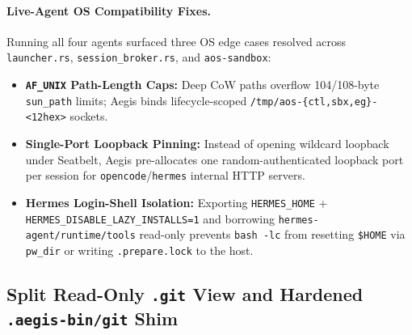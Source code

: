 \documentclass[10pt,twocolumn]{article}
\begin{document}
\paragraph{Live-Agent OS Compatibility Fixes.}
Running all four agents surfaced three OS edge cases resolved across \texttt{launcher.rs}, \texttt{session\_broker.rs}, and \texttt{aos-sandbox}:
\begin{itemize}
    \item \textbf{\texttt{AF\_UNIX} Path-Length Caps:} Deep CoW paths overflow 104/108-byte \texttt{sun\_path} limits; Aegis binds lifecycle-scoped \texttt{/tmp/aos-\{ctl,sbx,eg\}-<12hex>} sockets.
    \item \textbf{Single-Port Loopback Pinning:} Instead of opening wildcard loopback under Seatbelt, Aegis pre-allocates one random-authenticated loopback port per session for \texttt{opencode}/\texttt{hermes} internal HTTP servers.
    \item \textbf{Hermes Login-Shell Isolation:} Exporting \texttt{HERMES\_HOME} + \texttt{HERMES\_\allowbreak DISABLE\_\allowbreak LAZY\_\allowbreak INSTALLS=1} and borrowing \texttt{hermes-agent/\allowbreak runtime/\allowbreak tools} read-only prevents \texttt{bash -lc} from resetting \texttt{\$HOME} via \texttt{pw\_dir} or writing \texttt{.prepare.lock} to the host.
\end{itemize}

\subsection{Split Read-Only \texttt{.git} View and Hardened \texttt{.aegis-bin/git} Shim}
\end{document}
